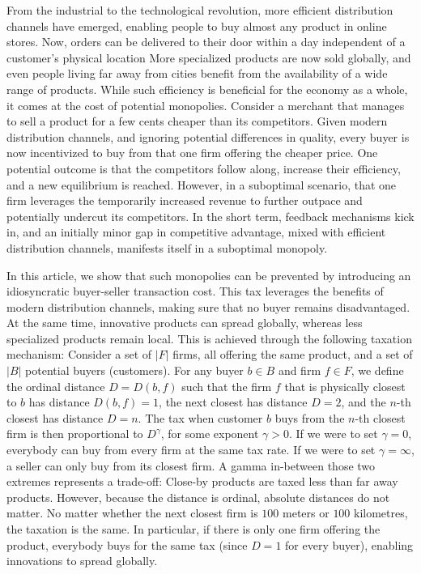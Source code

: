 \documentclass[final,3p,times,authoryear,12pt]{elsarticle}
\begin{document}
From the industrial to the technological revolution, more efficient distribution
channels have emerged, enabling people to buy almost any product in online
stores. Now, orders can be delivered to their door within a day independent of a
customer's physical location  More specialized products are now sold globally,
and even people living far away from cities benefit from the availability of a
wide range of products. While such efficiency is beneficial for the economy as a
whole, it comes at the cost of potential monopolies.  Consider a merchant that
manages to sell a product for a few cents cheaper than its competitors.  Given
modern distribution channels, and ignoring potential differences in quality,
every buyer is now incentivized to buy from that one firm offering the cheaper
price. One potential outcome is that the competitors follow along, increase
their efficiency, and a new equilibrium is reached.  However, in a suboptimal
scenario, that one firm leverages the temporarily increased revenue to further
outpace and potentially undercut its competitors.  In the short term, feedback
mechanisms kick in, and an initially minor gap in competitive advantage, mixed
with efficient distribution channels, manifests itself in a suboptimal monopoly. 

In this article, we show that such monopolies can be prevented by introducing an idiosyncratic buyer-seller transaction cost.
This tax leverages the benefits of modern distribution channels, making sure that no buyer remains disadvantaged. 
At the same time, innovative products can spread globally, whereas less specialized products remain local. 
This is achieved through the following taxation mechanism: 
Consider a set of $|F|$ firms, all offering the same product, and a set of $|B|$ potential buyers (customers). 
For any buyer $b \in B$ and firm $f \in F$, we define the ordinal distance $D = D(b,f)$ such that the firm $f$ that is physically closest to $b$ has distance $D(b,f)=1$, the next closest has distance $D=2$, and the $n$-th closest has distance $D=n$. 
The tax when customer $b$ buys from the $n$-th closest firm is then proportional to $D^\gamma$, for some exponent $\gamma > 0$. 
If we were to set $\gamma = 0$, everybody can buy from every firm at the same tax rate. 
If we were to set $\gamma=\infty$, a seller can only buy from its closest firm.
A gamma in-between those two extremes represents a trade-off: 
Close-by products are taxed less than far away products. 
However, because the distance is ordinal, absolute distances do not matter. 
No matter whether the next closest firm is $100$ meters or $100$ kilometres, the taxation is the same. 
In particular, if there is only one firm offering the product, everybody buys for the same tax (since $D=1$ for every buyer), enabling innovations to spread globally.  
\end{document}
